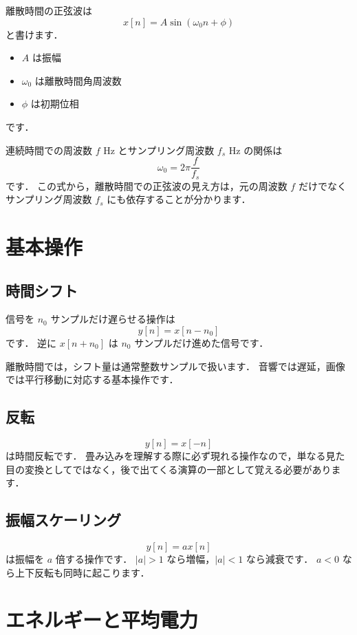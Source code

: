 離散時間の正弦波は
\[
x[n] = A \sin(\omega_0 n + \phi)
\]
と書けます．

\begin{itemize}
\item $A$ は振幅
\item $\omega_0$ は離散時間角周波数
\item $\phi$ は初期位相
\end{itemize}

です．

連続時間での周波数 $f$ Hz とサンプリング周波数 $f_s$ Hz の関係は
\[
\omega_0 = 2\pi \frac{f}{f_s}
\]
です．
この式から，離散時間での正弦波の見え方は，元の周波数 $f$ だけでなくサンプリング周波数 $f_s$ にも依存することが分かります．


\section{基本操作}

\subsection{時間シフト}

信号を $n_0$ サンプルだけ遅らせる操作は
\[
y[n] = x[n - n_0]
\]
です．
逆に $x[n+n_0]$ は $n_0$ サンプルだけ進めた信号です．

離散時間では，シフト量は通常整数サンプルで扱います．
音響では遅延，画像では平行移動に対応する基本操作です．


\subsection{反転}

\[
y[n] = x[-n]
\]
は時間反転です．
畳み込みを理解する際に必ず現れる操作なので，単なる見た目の変換としてではなく，後で出てくる演算の一部として覚える必要があります．


\subsection{振幅スケーリング}

\[
y[n] = a x[n]
\]
は振幅を $a$ 倍する操作です．
$|a| > 1$ なら増幅，$|a| < 1$ なら減衰です．
$a < 0$ なら上下反転も同時に起こります．


\section{エネルギーと平均電力}

